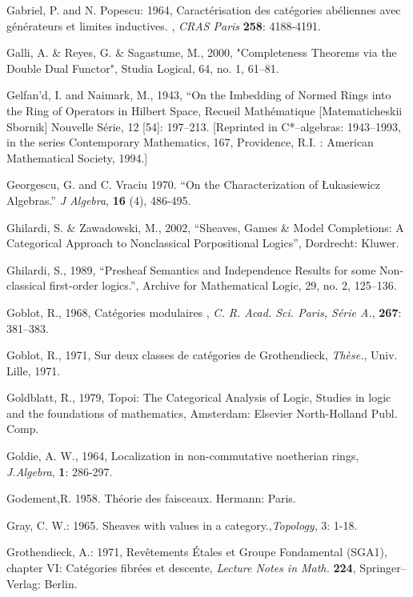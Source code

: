 \documentclass[12pt]{article}
\begin{document}
\begin{thebibliography}{399}
Gabriel, P. and N. Popescu: 1964, Caract\'{e}risation des cat\'egories ab\'eliennes
avec g\'{e}n\'{e}rateurs et limites inductives. , \emph{CRAS Paris} \textbf{258}: 4188-4191.

Galli, A. \& Reyes, G. \& Sagastume, M., 2000, "Completeness Theorems via the Double Dual Functor", Studia Logical, 64, no. 1, 61--81. 

Gelfan'd, I. and Naimark, M., 1943, ``On the Imbedding of Normed Rings into the 
Ring of Operators in Hilbert Space, Recueil Math\'ematique [Matematicheskii 
Sbornik] Nouvelle S\'erie, 12 [54]: 197--213. [Reprinted in C*--algebras: 
1943--1993, in the series Contemporary Mathematics, 167,  Providence, R.I. : 
American Mathematical Society, 1994.] 

Georgescu, G. and C. Vraciu 1970. ``On the Characterization of \L{}ukasiewicz 
Algebras.'' \emph{J Algebra}, \textbf{16} (4), 486-495.

Ghilardi, S. \& Zawadowski, M., 2002, ``Sheaves, Games \& Model Completions: A Categorical Approach to Nonclassical Porpositional Logics'', Dordrecht: Kluwer.  

Ghilardi, S., 1989, ``Presheaf Semantics and Independence Results for some Non-classical first-order logics.'', Archive for Mathematical Logic, 29, no. 2, 125--136. 

Goblot, R., 1968, Cat\'egories modulaires , {\em C. R. Acad. Sci. Paris, S\'erie A.}, \textbf{267}: 381--383.

Goblot, R., 1971, Sur deux classes de cat\'egories de Grothendieck, {\em Th\`ese.}, Univ. Lille, 1971.

Goldblatt, R., 1979, Topoi: The Categorical Analysis of Logic, Studies in logic and the foundations of mathematics, Amsterdam: Elsevier North-Holland Publ. Comp. 

Goldie, A. W., 1964, Localization in non-commutative noetherian rings, {\em J.Algebra}, \textbf{1}: 286-297.

Godement,R. 1958. Th\'{e}orie des faisceaux. Hermann: Paris.

Gray, C. W.: 1965. Sheaves with values in a category.,\emph {Topology}, 3: 1-18.

Grothendieck, A.: 1971, Rev\^{e}tements \'Etales et Groupe Fondamental (SGA1),
chapter VI: Cat\'egories fibr\'ees et descente, \emph{Lecture Notes in Math.}
\textbf{224}, Springer--Verlag: Berlin.


\end{thebibliography}
\end{document}
